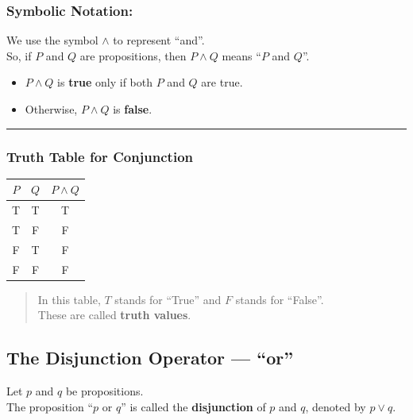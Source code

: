 \documentclass[
]{book}
\providecommand{\tightlist}{%
  \setlength{\itemsep}{0pt}\setlength{\parskip}{0pt}}
\theoremstyle{definition}
\theoremstyle{definition}
\theoremstyle{definition}
\theoremstyle{definition}
\theoremstyle{remark}
\begin{document}
\subsubsection{Symbolic Notation:}\label{symbolic-notation}

We use the symbol \(\land\) to represent ``and''.\\
So, if \(P\) and \(Q\) are propositions, then \(P \land Q\) means ``\(P\) and \(Q\)''.

\begin{itemize}
\tightlist
\item
  \(P \land Q\) is \textbf{true} only if both \(P\) and \(Q\) are true.
\item
  Otherwise, \(P \land Q\) is \textbf{false}.
\end{itemize}

\begin{center}\rule{0.5\linewidth}{0.5pt}\end{center}

\subsubsection{Truth Table for Conjunction}\label{truth-table-for-conjunction}

\begin{longtable}[]{@{}ccc@{}}
\toprule\noalign{}
\(P\) & \(Q\) & \(P \land Q\) \\
\midrule\noalign{}
\endhead
\bottomrule\noalign{}
\endlastfoot
T & T & T \\
T & F & F \\
F & T & F \\
F & F & F \\
\end{longtable}

\begin{quote}
In this table, \(T\) stands for ``True'' and \(F\) stands for ``False''.\\
These are called \textbf{truth values}.
\end{quote}

\subsection{The Disjunction Operator --- ``or''}\label{the-disjunction-operator-or}

Let \(p\) and \(q\) be propositions.\\
The proposition ``\(p\) or \(q\)'' is called the \textbf{disjunction} of \(p\) and \(q\), denoted by \(p \lor q\).
\end{document}
